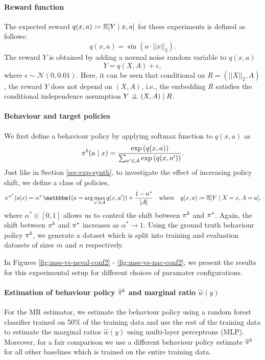  \paragraph{Reward function}
The expected reward $q(x, a)\coloneqq\mathbb{E}[Y\mid x, a]$ for these experiments is defined as follows:
\[
    q(x, a) = \sin \left(a \cdot ||x||_2 \right). 
\]
The reward $Y$ is obtained by adding a normal noise random variable to $q(x, a)$
\[
Y = q(X, A) + \epsilon, 
\]
where $\epsilon \sim \mathcal{N}(0, 0.01)$. Here, it can be seen that conditional on $R=(||X||_2, A)$, the reward $Y$ does not depend on $(X, A)$, i.e., the embedding $R$ satisfies the conditional independence assumption $Y \perp \!\!\! \perp (X, A) \mid R$. 

\paragraph{Behaviour and target policies}
We first define a behaviour policy by applying softmax function to $q(x, a)$ as
\[
\pi^b(a\mid x) = \frac{\exp{(q(x, a))}}{\sum_{a' \in \mathcal{A}} \exp{(q(x, a'))}}.
\]
Just like in Section \ref{sec:exp-synth}, to investigate the effect of increasing policy shift, we define a class of policies,
\[
\pi^{\alpha^\ast}(a | x) = \alpha^\ast\,\ind(a = \arg\max_{a'\in \Aspace} q(x, a')) + \frac{1-\alpha^\ast}{|\Aspace|} \quad \textup{where} \quad q(x, a) \coloneqq \E[Y\mid X=x, A=a],
\]
where $\alpha^\ast \in [0, 1]$ allows us to control the shift between $\pi^b$ and $\pi^*$. Again, the shift between $\pi^b$ and $\pi^*$ increases as $\alpha^\ast \rightarrow 1$. Using the ground truth behaviour policy $\pi^b$, we generate a dataset which is split into training and evaluation datasets of sizes $m$ and $n$ respectively. 

In Figures \ref{fig:mse-vs-neval-conf2} - \ref{fig:mse-vs-nac-conf2}, we present the results for this experimental setup for different choices of paramater configurations. 

\paragraph{Estimation of behaviour policy $\widehat{\pi}^b$ and marginal ratio $\hat{w}(y)$}
For the MR estimator, we estimate the behaviour policy using a random forest classifier trained on 50\% of the training data and use the rest of the training data to estimate the marginal ratios $\hat{w}(y)$ using multi-layer perceptrons (MLP). Moreover, for a fair comparison we use a different behaviour policy estimate $\widehat{\pi}^b$ for all other baselines which is trained on the entire training data. 

